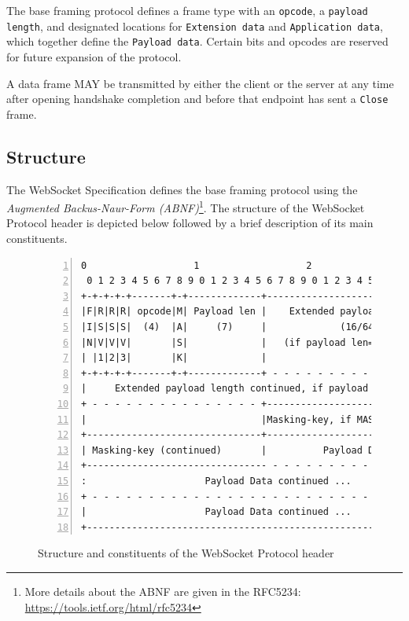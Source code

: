 \documentclass[a4paper, justified, notoc]{tufte-handout} %
\begin{document}
The base framing protocol defines a frame type with an \texttt{opcode}, a \texttt{payload length}, and designated locations for \texttt{Extension data} and \texttt{Application data}, which together define the \texttt{Payload data}. Certain bits and opcodes are reserved for future expansion of the protocol.

A data frame MAY be transmitted by either the client or the server at any time after opening handshake completion and before that endpoint has sent a \texttt{Close} frame.


\subsection{Structure} %
\label{sub:structure}

The WebSocket Specification defines the base framing protocol using the \emph{Augmented Backus-Naur-Form (ABNF)}\footnote{More details about the ABNF are given in the RFC5234: \url{https://tools.ietf.org/html/rfc5234}}. The structure of the WebSocket Protocol header is depicted below followed by a brief description of its main constituents.


\begin{figure}
\begin{Verbatim}[gobble=0,frame=none,numbers=left]
 0                   1                   2                   3
 0 1 2 3 4 5 6 7 8 9 0 1 2 3 4 5 6 7 8 9 0 1 2 3 4 5 6 7 8 9 0 1
+-+-+-+-+-------+-+-------------+-------------------------------+
|F|R|R|R| opcode|M| Payload len |    Extended payload length    |
|I|S|S|S|  (4)  |A|     (7)     |             (16/64)           |
|N|V|V|V|       |S|             |   (if payload len==126/127)   |
| |1|2|3|       |K|             |                               |
+-+-+-+-+-------+-+-------------+ - - - - - - - - - - - - - - - +
|     Extended payload length continued, if payload len == 127  |
+ - - - - - - - - - - - - - - - +-------------------------------+
|                               |Masking-key, if MASK set to 1  |
+-------------------------------+-------------------------------+
| Masking-key (continued)       |          Payload Data         |
+-------------------------------- - - - - - - - - - - - - - - - +
:                     Payload Data continued ...                :
+ - - - - - - - - - - - - - - - - - - - - - - - - - - - - - - - +
|                     Payload Data continued ...                |
+---------------------------------------------------------------+
\end{Verbatim}
\label{fig:protocol}
\caption{Structure and constituents of the WebSocket Protocol header}
\end{figure}
\end{document}
